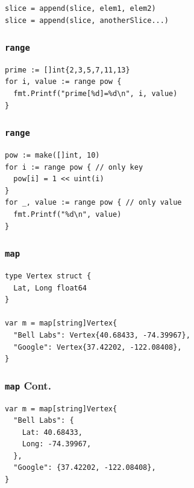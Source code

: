 \documentclass[xetex,mathserif,serif,12pt]{beamer}
\begin{document}
\begin{frame}[fragile]
\frametitle{}

  \begin{beamer@nomargin}
    \begin{lstlisting}
slice = append(slice, elem1, elem2)
slice = append(slice, anotherSlice...)
    \end{lstlisting}
  \end{beamer@nomargin}
\end{frame}

\begin{frame}[fragile]
  \frametitle{\texttt{range}}

  \begin{beamer@nomargin}
    \begin{lstlisting}
prime := []int{2,3,5,7,11,13}
for i, value := range pow {
  fmt.Printf("prime[%d]=%d\n", i, value)
}
    \end{lstlisting}
  \end{beamer@nomargin}
\end{frame}


\begin{frame}[fragile]
  \frametitle{\texttt{range}}

  \begin{beamer@nomargin}
    \begin{lstlisting}
pow := make([]int, 10)
for i := range pow { // only key
  pow[i] = 1 << uint(i)
}
for _, value := range pow { // only value
  fmt.Printf("%d\n", value)
}
    \end{lstlisting}
  \end{beamer@nomargin}
\end{frame}

\begin{frame}[fragile]
  \frametitle{\texttt{map}}

  \begin{beamer@nomargin}
    \begin{lstlisting}
type Vertex struct {
  Lat, Long float64
}

var m = map[string]Vertex{
  "Bell Labs": Vertex{40.68433, -74.39967},
  "Google": Vertex{37.42202, -122.08408},
}
    \end{lstlisting}
  \end{beamer@nomargin}
\end{frame}

\begin{frame}[fragile]
  \frametitle{\texttt{map} Cont.}

  \begin{beamer@nomargin}
    \begin{lstlisting}
var m = map[string]Vertex{
  "Bell Labs": {
    Lat: 40.68433,
    Long: -74.39967,
  },
  "Google": {37.42202, -122.08408},
}
    \end{lstlisting}
  \end{beamer@nomargin}
\end{frame}
\end{document}
